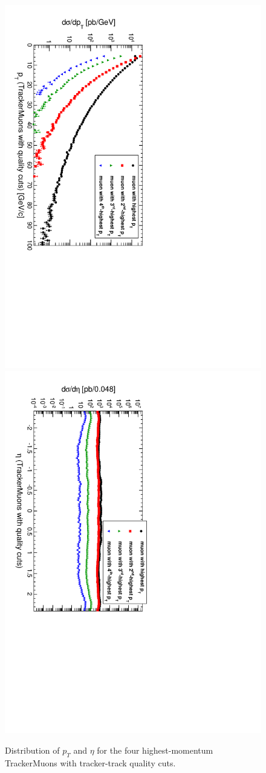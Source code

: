 \documentclass[12pt]{article}
\begin{document}
\begin{figure}
\includegraphics[height=0.5\linewidth, angle=90]{fig/backgroundsMatching_plot/ptcurves_GoodTracker.pdf}
\includegraphics[height=0.5\linewidth, angle=90]{fig/backgroundsMatching_plot/etacurves_GoodTracker.pdf}

\caption{Distribution of $p_T$ and $\eta$ for the four highest-momentum TrackerMuons with tracker-track quality cuts. \label{fig:curves_GoodTracker}}
\end{figure}
\end{document}
